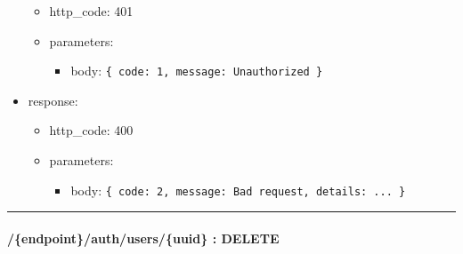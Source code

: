 \documentclass[
]{article}
\begin{document}
\begin{itemize}
  \begin{itemize}
  \item
    http\_code: 401
  \item
    parameters:

    \begin{itemize}
    \item
      body: \texttt{\{
      \textquotesingle{}code\textquotesingle{}:\ 1,\ 
      \textquotesingle{}message\textquotesingle{}:\ \textquotesingle{}Unauthorized\textquotesingle{}
      \}}
    \end{itemize}
  \end{itemize}
\item
  response:

  \begin{itemize}
  \item
    http\_code: 400
  \item
    parameters:

    \begin{itemize}
    \item
      body: \texttt{\{
      \textquotesingle{}code\textquotesingle{}:\ 2,
      \textquotesingle{}message\textquotesingle{}:\ \textquotesingle{}Bad\ request\textquotesingle{},
      \textquotesingle{}details\textquotesingle{}:\ \textquotesingle{}...\textquotesingle{}
      \}}
    \end{itemize}
  \end{itemize}
\end{itemize}

\begin{center}\rule{0.5\linewidth}{0.5pt}\end{center}

\hypertarget{header-n60918}{%
\paragraph{/\{endpoint\}/auth/users/\{uuid\} :
DELETE}\label{header-n60918}}
\end{document}
